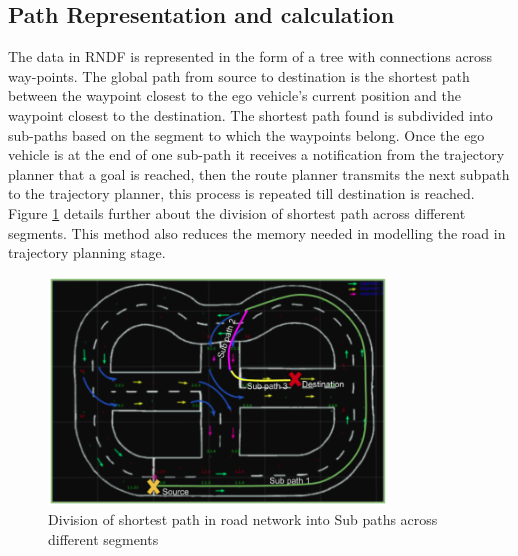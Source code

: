 


\subsection{Path Representation and calculation}

The data in RNDF is represented in the form of a tree with connections across way-points. The global path from source to destination is the shortest path between the waypoint closest to the ego vehicle's current position and the waypoint closest to the destination. The shortest path found is subdivided into sub-paths based on the segment to which the waypoints belong. Once the ego vehicle is at the end of one sub-path it receives a notification from the trajectory planner that a goal is reached, then the route planner transmits the next subpath to the trajectory planner, this process is repeated till destination is reached. Figure \ref{path_Segmentation} details further about the division of shortest path across different segments. This method also reduces the memory needed in modelling the road in trajectory planning stage.

\begin{figure}
    \centering
    \includegraphics[width=0.8\textwidth]{Images/path_Segmentation.png}
    \caption{Division of shortest path in road network into Sub paths across different segments}
    \label{path_Segmentation}
\end{figure}

